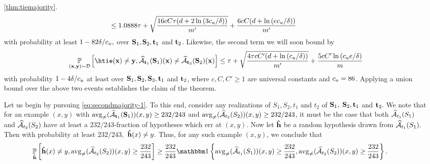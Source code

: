 \begin{proofof}{\cref{thm:tiemajority}.}
\begin{align}
& \hspace{-1.7cm} \qquad \leq 1.0888\tau+\sqrt{\frac{16cC\tau(d+2\ln{\left(3\cu/\delta \right)})}{m'}}+\frac{6cC(d+\ln{\left(e\cu /\delta \right)})}{m'} 
\end{align}
with probability at least $1- 82\delta/c_{u},$ over $ \mathbf{S}_{1},\mathbf{S}_{2},\mathbf{t}_{1} $ and $ \mathbf{t}_{2} $. Likewise, the second term we will soon bound by 
\begin{align}\label{eq:secondmajority-2}
    \p_{(\rx,\ry)\sim\cD}\left[ \htie(\rx)\not=\ry, \widehat{\cA}_{\rt_{1}}(\rS_{1})(\rx)\not=\widehat{\cA}_{\rt_{2}}(\rS_{2})(\rx)\right]\leq  
    \tau+ \sqrt{\frac{4\tau cC'(d+\ln{\left(\cu/\delta \right)})}{m'}}+\frac{5cC'\ln{\left(\cu e/\delta \right)}}{m}
\end{align}
with probability $ 1-4\delta/c_{u} $ at least over $ \mathbf{S}_{1},\mathbf{S}_{2}, \mathbf{S}_{3},\mathbf{t}_{1} $ and $ \mathbf{t}_{2} $, where $ c,C,C'\geq 1 $ are universal constants and $ c_{u}= 86$. 
Applying a union bound over the above two events establishes the claim of the theorem. 


Let us begin by pursuing \cref{eq:secondmajority-1}. 
To this end, consider any realizations of $ S_{1},S_{2},t_{1}$ and $ t_{2} $ of $ \mathbf{S}_{1},$ $ \mathbf{S}_{2}, \mathbf{t}_{1}$ and $ \mathbf{t}_{2}.$ 
We note that for an example $ (x,y) $ with $ \operatorname{\mathrm{avg}_{\not=}}(\widehat{\mathcal{A}}_{\mathbf{t}_{1}}(\mathbf{S}_{1}))(x,y)\geq 232/243$ and $\operatorname{\mathrm{avg}_{\not=}}(\widehat{\mathcal{A}}_{t_{2}}(S_{2}))(x,y)\geq 232/243$, it must be the case that both $ \widehat{\mathcal{A}}_{t_{1}}(S_{1}) $ and $ \widehat{\mathcal{A}}_{t_{2}}(S_{2}) $  have at least a $ 232/243 $-fraction of hypotheses which err at $(x, y)$. 
Now let $ \mathbf{\hat{h}} $ be a random hypothesis drawn from $ \widehat{\mathcal{A}}_{t_{1}}(S_{1}).$ Then with probability at least $ 232/243,$ $ \mathbf{\hat{h}}(x)\not=y.$ 
Thus, for any such example $ (x,y) $, we conclude that  
\begin{align*}
\hspace{-0.6 cm}
 \p_{\rh}\left[\rh(x)\not=y,\avg(\widehat{\cA}_{t_{2}}(S_{2}))(x,y)\geq \frac{232}{243}\right]\geq \frac{232}{243}\ind\left\{ \avg(\widehat{\cA}_{t_{1}}(S_{1}))(x,y)\geq \frac{232}{243},\avg(\widehat{\cA}_{t_{2}}(S_{2}))(x,y)\geq \frac{232}{243} \right\}. 
\end{align*}


\end{proofof}
